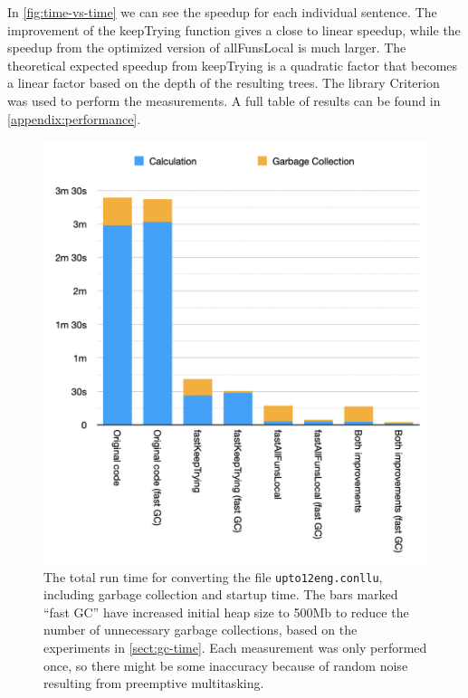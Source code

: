 In \autoref{fig:time-vs-time} we can see the speedup for each individual sentence. The improvement of the keepTrying function gives a close to linear speedup, while the speedup from the optimized version of allFunsLocal is much larger. The theoretical expected speedup from keepTrying is a quadratic factor that becomes a linear factor based on the depth of the resulting trees. The library Criterion\protect\footnotemark{} was used to perform the measurements. A full table of results can be found in \autoref{appendix:performance}.
\begin{figure}
    \centering
    \includegraphics[scale=0.75]{figure/Time-including-GC.png}
    \caption[The total run time for converting the file \texttt{upto12eng.conllu}, including garbage collection and startup time.]{The total run time for converting the file \texttt{upto12eng.conllu}, including garbage collection and startup time. The bars marked ``fast GC'' have increased initial heap size to 500Mb to reduce the number of unnecessary garbage collections, based on the experiments in \autoref{sect:gc-time}. Each measurement was only performed once, so there might be some inaccuracy because of random noise resulting from preemptive multitasking.}
    \label{fig:time-including-gc}
\end{figure}
